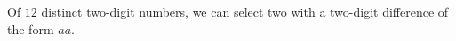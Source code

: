Of $12$ distinct two-digit numbers, we can select two with a two-digit difference of the form $aa$.
